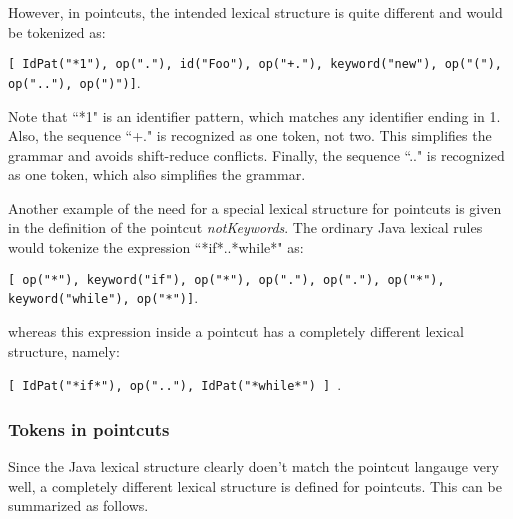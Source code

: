 \noindent
However, in
pointcuts, the intended lexical structure is quite different and
would be tokenized as:

{\tt[ IdPat("*1"), op("."), id("Foo"), op("+."),
keyword("new"), op("("), op(".."), op(")")]}.   

\noindent 
Note that ``*1" is
an identifier pattern, which matches any identifier ending in 1.  Also, the
sequence ``+." is recognized as one token, not two.  This simplifies
the grammar and avoids shift-reduce conflicts.  Finally, the sequence
``.." is recognized as one token, which also simplifies the grammar.

Another example of the need for a special lexical structure for pointcuts
is given in the definition of the pointcut {\em notKeywords}.   The ordinary
Java lexical rules would tokenize the expression ``*if*..*while*" as:

{\tt[ op("*"), keyword("if"), op("*"), op("."), op("."), op("*"), 
keyword("while"), op("*")]}.

\noindent
whereas this expression inside a pointcut has a completely different lexical
structure, namely:

{\tt[ IdPat("*if*"), op(".."), IdPat("*while*") ] }.
 
\subsubsection{Tokens in pointcuts}
Since the Java lexical structure clearly doen't match the pointcut
langauge very well,  a completely different lexical structure is
defined for pointcuts.   This can be summarized as follows.

